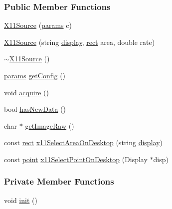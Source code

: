 \subsubsection*{\-Public \-Member \-Functions}
\begin{DoxyCompactItemize}
\item 
\hyperlink{classX11Source_a78acc272509b4489ba63e31708f15679}{\-X11\-Source} (\hyperlink{structX11Source_1_1params}{params} c)
\item 
\hyperlink{classX11Source_ac84c868de1b1ad71165dda3426cd03b3}{\-X11\-Source} (string \hyperlink{classX11Source_aca767875225424e06a91240ce66878fd}{display}, \hyperlink{structrect}{rect} area, double rate)
\item 
\hyperlink{classX11Source_a40ce038f2f6099f2ade3a07ebbfa1ddf}{$\sim$\-X11\-Source} ()
\item 
\hyperlink{structX11Source_1_1params}{params} \hyperlink{classX11Source_a7463cf93c1a347420ea423c993fb3db0}{get\-Config} ()
\item 
void \hyperlink{classX11Source_a1f1e97d8c02bfe6d5d84fb06a06125ba}{acquire} ()
\item 
bool \hyperlink{classX11Source_aa9b91f2a4a6db72b9391bc43d8f73944}{has\-New\-Data} ()
\item 
char $\ast$ \hyperlink{classX11Source_a224081f6ba7b80a1f4606cad8887e190}{get\-Image\-Raw} ()
\item 
const \hyperlink{structrect}{rect} \hyperlink{classX11Source_afcec9428c2cc28dca81f6839d079ca0f}{x11\-Select\-Area\-On\-Desktop} (string \hyperlink{classX11Source_aca767875225424e06a91240ce66878fd}{display})
\item 
const \hyperlink{structpoint}{point} \hyperlink{classX11Source_a8664f8ad4c33f46437cc2f02a5b76e49}{x11\-Select\-Point\-On\-Desktop} (\-Display $\ast$disp)
\end{DoxyCompactItemize}
\subsubsection*{\-Private \-Member \-Functions}
\begin{DoxyCompactItemize}
\item 
void \hyperlink{classX11Source_a44750861c3d995fae7436aff4940f372}{init} ()
\end{DoxyCompactItemize}

